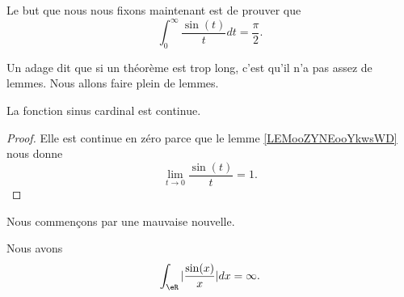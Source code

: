 \begin{normaltext}
    Le but que nous nous fixons maintenant est de prouver que
    \begin{equation}
        \int_{0}^{\infty}\frac{ \sin(t) }{ t }dt=\frac{ \pi }{2}.
    \end{equation}

    Un adage dit que si un théorème est trop long, c'est qu'il n'a pas assez de lemmes. Nous allons faire plein de lemmes.
\end{normaltext}

\begin{lemma}
    La fonction sinus cardinal est continue.
\end{lemma}

\begin{proof}
    Elle est continue en zéro parce que le lemme \ref{LEMooZYNEooYkwsWD} nous donne
    \begin{equation}
        \lim_{t\to 0}\frac{ \sin(t) }{ t }=1.
    \end{equation}
\end{proof}

Nous commençons par une mauvaise nouvelle.
\begin{lemma}           \label{LEMooEEWSooZwLSAP}
    Nous avons
    \begin{equation}
        \int_{\eR}| \frac{ \sin(x) }{ x } |dx=\infty.
    \end{equation}
\end{lemma}


